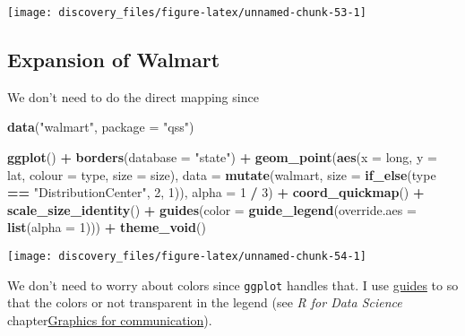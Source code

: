 \documentclass[]{book}
\newenvironment{Shaded}{\begin{snugshade}}{\end{snugshade}}
\newcommand{\KeywordTok}[1]{\textcolor[rgb]{0.13,0.29,0.53}{\textbf{#1}}}
\newcommand{\DataTypeTok}[1]{\textcolor[rgb]{0.13,0.29,0.53}{#1}}
\newcommand{\DecValTok}[1]{\textcolor[rgb]{0.00,0.00,0.81}{#1}}
\newcommand{\StringTok}[1]{\textcolor[rgb]{0.31,0.60,0.02}{#1}}
\newcommand{\OperatorTok}[1]{\textcolor[rgb]{0.81,0.36,0.00}{\textbf{#1}}}
\newcommand{\NormalTok}[1]{#1}
\theoremstyle{definition}
\theoremstyle{definition}
\theoremstyle{definition}
\theoremstyle{remark}
\begin{document}
\begin{center}\texttt{[image: discovery\_files/figure-latex/unnamed-chunk-53-1]} \end{center}

\subsection{Expansion of Walmart}\label{expansion-of-walmart}

We don't need to do the direct mapping since

\begin{Shaded}
\begin{Highlighting}[]
\KeywordTok{data}\NormalTok{(}\StringTok{"walmart"}\NormalTok{, }\DataTypeTok{package =} \StringTok{"qss"}\NormalTok{)}

\KeywordTok{ggplot}\NormalTok{() }\OperatorTok{+}
\StringTok{  }\KeywordTok{borders}\NormalTok{(}\DataTypeTok{database =} \StringTok{"state"}\NormalTok{) }\OperatorTok{+}
\StringTok{  }\KeywordTok{geom_point}\NormalTok{(}\KeywordTok{aes}\NormalTok{(}\DataTypeTok{x =}\NormalTok{ long, }\DataTypeTok{y =}\NormalTok{ lat, }\DataTypeTok{colour =}\NormalTok{ type, }\DataTypeTok{size =}\NormalTok{ size),}
             \DataTypeTok{data =} \KeywordTok{mutate}\NormalTok{(walmart,}
                           \DataTypeTok{size =} \KeywordTok{if_else}\NormalTok{(type }\OperatorTok{==}\StringTok{ "DistributionCenter"}\NormalTok{, }\DecValTok{2}\NormalTok{, }\DecValTok{1}\NormalTok{)),}
             \DataTypeTok{alpha =} \DecValTok{1} \OperatorTok{/}\StringTok{ }\DecValTok{3}\NormalTok{) }\OperatorTok{+}
\StringTok{  }\KeywordTok{coord_quickmap}\NormalTok{() }\OperatorTok{+}
\StringTok{  }\KeywordTok{scale_size_identity}\NormalTok{() }\OperatorTok{+}
\StringTok{  }\KeywordTok{guides}\NormalTok{(}\DataTypeTok{color =} \KeywordTok{guide_legend}\NormalTok{(}\DataTypeTok{override.aes =} \KeywordTok{list}\NormalTok{(}\DataTypeTok{alpha =} \DecValTok{1}\NormalTok{))) }\OperatorTok{+}
\StringTok{  }\KeywordTok{theme_void}\NormalTok{()}
\end{Highlighting}
\end{Shaded}

\begin{center}\texttt{[image: discovery\_files/figure-latex/unnamed-chunk-54-1]} \end{center}

We don't need to worry about colors since \texttt{ggplot} handles that.
I use \href{http://docs.ggplot2.org/current/guides.html}{guides} to so
that the colors or not transparent in the legend (see \emph{R for Data
Science}
chapter\href{http://r4ds.had.co.nz/graphics-for-communication.html}{Graphics
for communication}).
\end{document}

